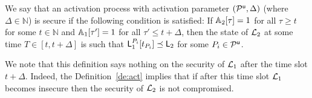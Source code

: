 
\begin{definition}\label{de:act}
 We say that an activation process with activation parameter $(\mathcal{P}^\mathsf{u}, \Delta)$ (where $\Delta\in\mathbb{N}$) is secure if the following condition is satisfied:
If $\mathbb{A}_2[\tau]=1$ for all $\tau\geq t$ for some $t\in\mathbb{N}$
and $\mathbb{A}_1[\tau']=1$ for all $\tau' \leq t +\Delta$, then the state of $\mathcal{L}_2$ at some time 
$T\in [t, t+\Delta]$
 is such that $\mathsf{L}_1^{P_i}[t_{P_i}] \preceq \mathsf{L}_2$ for some $P_i\in\mathcal{P}^\mathsf{u}$.
\end{definition}

We note that this definition says nothing on the security of $\mathcal{L}_1$ after the time slot $t+\Delta$. Indeed, the Definition~\ref{de:act} implies that if
after this time slot $\mathcal{L}_1$ becomes insecure then the security of $\mathcal{L}_2$ is not compromised.



